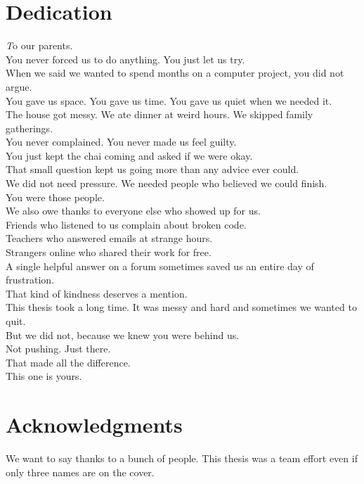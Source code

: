 \documentclass[12pt, a4paper, oneside]{book}
\begin{document}
\chapter*{Dedication}
\begin{center}
\emph
To our parents.\\
You never forced us to do anything. You just let us try.\\
When we said we wanted to spend months on a computer project, you did not argue.\\
You gave us space. You gave us time. You gave us quiet when we needed it.\\
The house got messy. We ate dinner at weird hours. We skipped family gatherings.\\
You never complained. You never made us feel guilty.\\
You just kept the chai coming and asked if we were okay.\\
That small question kept us going more than any advice ever could.\\
We did not need pressure. We needed people who believed we could finish.\\
You were those people.\\
\bigskip
We also owe thanks to everyone else who showed up for us.\\
Friends who listened to us complain about broken code.\\
Teachers who answered emails at strange hours.\\
Strangers online who shared their work for free.\\
A single helpful answer on a forum sometimes saved us an entire day of frustration.\\
That kind of kindness deserves a mention.\\
\bigskip
This thesis took a long time. It was messy and hard and sometimes we wanted to quit.\\
But we did not, because we knew you were behind us.\\
Not pushing. Just there.\\
That made all the difference.\\
\bigskip
This one is yours.
\end{center}

\clearpage
\thispagestyle{plain}
\chapter*{Acknowledgments}
We want to say thanks to a bunch of people. This thesis was a team effort even if only three names are on the cover.
\end{document}
